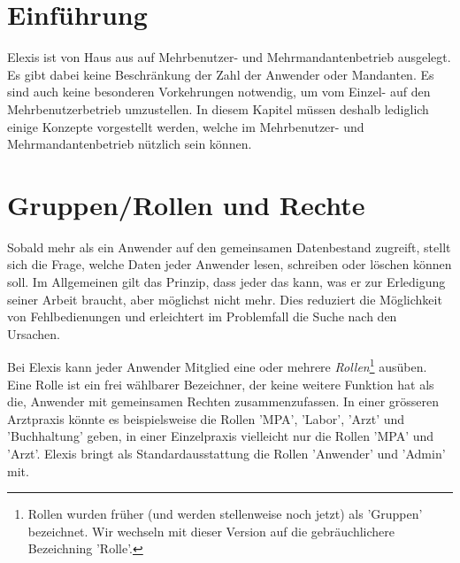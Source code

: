 
\section{Einführung}
Elexis ist von Haus aus auf Mehrbenutzer- und Mehrmandantenbetrieb ausgelegt.
Es gibt dabei keine Beschränkung der Zahl der Anwender oder Mandanten. Es sind
auch keine besonderen Vorkehrungen notwendig, um vom Einzel- auf den
Mehrbenutzerbetrieb umzustellen. In diesem Kapitel müssen deshalb lediglich
einige Konzepte vorgestellt werden, welche im Mehrbenutzer- und
Mehrmandantenbetrieb nützlich sein können.

\section{Gruppen/Rollen und Rechte}
\label{sec:gruppen}
Sobald mehr als ein Anwender auf den gemeinsamen Datenbestand zugreift, stellt
sich die Frage, welche Daten jeder Anwender lesen, schreiben oder löschen können
soll. Im Allgemeinen gilt das Prinzip, dass jeder das kann, was er
zur Erledigung seiner Arbeit braucht, aber möglichst nicht mehr. Dies reduziert
die Möglichkeit von Fehlbedienungen und erleichtert im Problemfall die Suche
nach den Ursachen.

Bei Elexis kann jeder Anwender Mitglied eine oder mehrere \textit{Rollen}\footnote{Rollen wurden früher (und werden stellenweise noch jetzt) als 'Gruppen' bezeichnet. Wir wechseln mit dieser Version auf die gebräuchlichere Bezeichning 'Rolle'.} ausüben. Eine Rolle ist ein frei wählbarer Bezeichner, der keine weitere Funktion hat als
die, Anwender mit gemeinsamen Rechten zusammenzufassen. In einer grösseren
Arztpraxis könnte es beispielsweise die Rollen 'MPA', 'Labor', 'Arzt' und
'Buchhaltung' geben, in einer Einzelpraxis vielleicht nur die Rollen 'MPA' und
'Arzt'. Elexis bringt als Standardausstattung die Rollen 'Anwender' und 'Admin'
mit.

